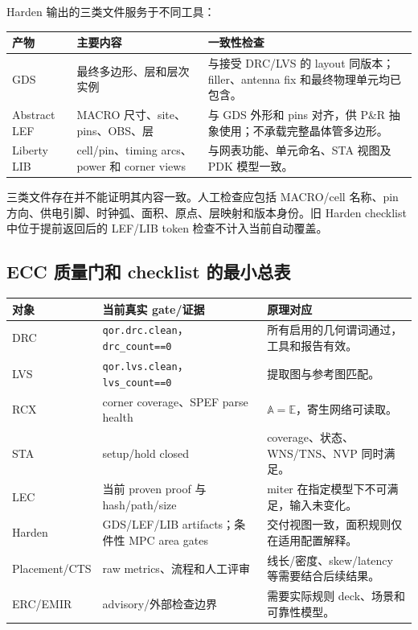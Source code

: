 \documentclass[UTF8,a4paper,11pt,fontset=fandol]{ctexart}
\numberwithin{equation}{section}
\newcommand{\code}[1]{\nolinkurl{#1}}
\begin{document}
Harden 输出的三类文件服务于不同工具：
\begin{center}
\begin{tabularx}{\textwidth}{p{}p{}X}
\toprule
产物 & 主要内容 & 一致性检查 \\
\midrule
GDS & 最终多边形、层和层次实例 & 与接受 DRC/LVS 的 layout 同版本；filler、antenna fix 和最终物理单元均已包含。 \\
Abstract LEF & MACRO 尺寸、site、pins、OBS、层 & 与 GDS 外形和 pins 对齐，供 P\&R 抽象使用；不承载完整晶体管多边形。 \\
Liberty LIB & cell/pin、timing arcs、power 和 corner views & 与网表功能、单元命名、STA 视图及 PDK 模型一致。 \\
\bottomrule
\end{tabularx}
\end{center}

三类文件存在并不能证明其内容一致。人工检查应包括 MACRO/cell 名称、pin 方向、供电引脚、时钟弧、面积、原点、层映射和版本身份。旧 Harden checklist 中位于提前返回后的 LEF/LIB token 检查不计入当前自动覆盖。

\subsection{ECC 质量门和 checklist 的最小总表}

\begin{center}
\begin{tabularx}{\textwidth}{p{}p{}X}
\toprule
对象 & 当前真实 gate/证据 & 原理对应 \\
\midrule
DRC & \code{qor.drc.clean}，\code{drc_count==0} & 所有启用的几何谓词通过，工具和报告有效。 \\
LVS & \code{qor.lvs.clean}，\code{lvs_count==0} & 提取图与参考图匹配。 \\
RCX & corner coverage、SPEF parse health & $\mathbb{A}=\mathbb{E}$，寄生网络可读取。 \\
STA & setup/hold closed & coverage、状态、WNS/TNS、NVP 同时满足。 \\
LEC & 当前 proven proof 与 hash/path/size & miter 在指定模型下不可满足，输入未变化。 \\
Harden & GDS/LEF/LIB artifacts；条件性 MPC area gates & 交付视图一致，面积规则仅在适用配置解释。 \\
Placement/CTS & raw metrics、流程和人工评审 & 线长/密度、skew/latency 等需要结合后续结果。 \\
ERC/EMIR & advisory/外部检查边界 & 需要实际规则 deck、场景和可靠性模型。 \\
\bottomrule
\end{tabularx}
\end{center}
\end{document}
